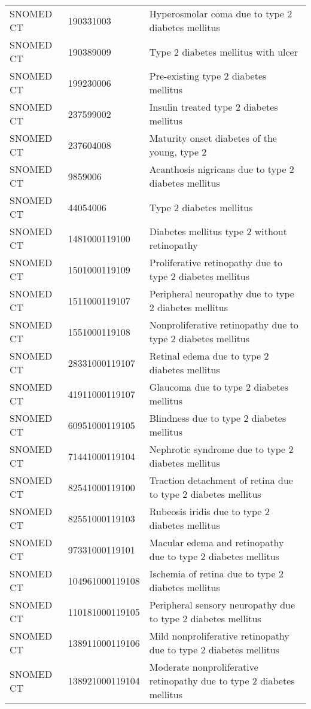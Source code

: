 \begin{longtable}{p{}p{}p{}}
  SNOMED CT & 190331003 & Hyperosmolar coma due to type 2 diabetes mellitus \\ 
  SNOMED CT & 190389009 & Type 2 diabetes mellitus with ulcer \\ 
  SNOMED CT & 199230006 & Pre-existing type 2 diabetes mellitus \\ 
  SNOMED CT & 237599002 & Insulin treated type 2 diabetes mellitus \\ 
  SNOMED CT & 237604008 & Maturity onset diabetes of the young, type 2 \\ 
  SNOMED CT & 9859006 & Acanthosis nigricans due to type 2 diabetes mellitus \\ 
  SNOMED CT & 44054006 & Type 2 diabetes mellitus \\ 
  SNOMED CT & 1481000119100 & Diabetes mellitus type 2 without retinopathy \\ 
  SNOMED CT & 1501000119109 & Proliferative retinopathy due to type 2 diabetes mellitus \\ 
  SNOMED CT & 1511000119107 & Peripheral neuropathy due to type 2 diabetes mellitus \\ 
  SNOMED CT & 1551000119108 & Nonproliferative retinopathy due to type 2 diabetes mellitus \\ 
  SNOMED CT & 28331000119107 & Retinal edema due to type 2 diabetes mellitus \\ 
  SNOMED CT & 41911000119107 & Glaucoma due to type 2 diabetes mellitus \\ 
  SNOMED CT & 60951000119105 & Blindness due to type 2 diabetes mellitus \\ 
  SNOMED CT & 71441000119104 & Nephrotic syndrome due to type 2 diabetes mellitus \\ 
  SNOMED CT & 82541000119100 & Traction detachment of retina due to type 2 diabetes mellitus \\ 
  SNOMED CT & 82551000119103 & Rubeosis iridis due to type 2 diabetes mellitus \\ 
  SNOMED CT & 97331000119101 & Macular edema and retinopathy due to type 2 diabetes mellitus \\ 
  SNOMED CT & 104961000119108 & Ischemia of retina due to type 2 diabetes mellitus \\ 
  SNOMED CT & 110181000119105 & Peripheral sensory neuropathy due to type 2 diabetes mellitus \\ 
  SNOMED CT & 138911000119106 & Mild nonproliferative retinopathy due to type 2 diabetes mellitus \\ 
  SNOMED CT & 138921000119104 & Moderate nonproliferative retinopathy due to type 2 diabetes mellitus \\ 

\end{longtable}
